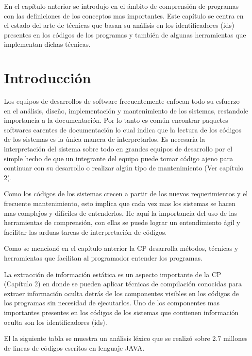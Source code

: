 \documentclass[12pt]{report}
\begin{document}

En el capítulo anterior se introdujo en el ámbito de comprensión de programas con las definiciones de los conceptos mas importantes. Este capítulo se centra en el estado del arte de técnicas que basan su análisis en los identificadores (ids) presentes en los códigos de los programas y también de algunas herramientas que implementan dichas técnicas.

\section{Introducción}

Los equipos de desarrollos de software frecuentemente enfocan todo su esfuerzo en el análisis, diseño, implementación y mantenimiento de los sistemas, restandole importancia a la documentación. Por lo tanto es común encontrar paquetes softwares carentes de documentación lo cual indica que la lectura de los códigos de los sistemas es la única manera de interpretarlos. Es necesaria la interpretación del sistema sobre todo en grandes equipos de desarrollo por el simple hecho de que un integrante del equipo puede tomar código ajeno para continuar con su desarrollo o realizar algún tipo de mantenimiento (Ver capítulo 2).

Como los códigos de los sistemas crecen a partir de los nuevos requerimientos y el frecuente mantenimiento, esto implica que cada vez mas los sistemas se hacen mas complejos y difíciles de entenderlos. He aquí la importancia del uso de las herramientas de comprensión, con ellas se puede lograr un entendimiento ágil y facilitar las arduas tareas de interpretación de códigos.

Como se mencionó en el capítulo anterior la CP desarrolla métodos, técnicas y herramientas que facilitan al programador entender los programas.

La extracción de información estática es un aspecto importante de la CP (Capítulo 2) en donde se pueden aplicar técnicas de compilación conocidas para extraer información oculta detrás de los componentes visibles en los códigos de los programas sin necesidad de ejecutarlos. Uno de los componentes mas importantes presentes en los códigos de los sistemas que contienen información oculta son los identificadores (ids).

El la siguiente tabla se muestra un análisis léxico que se realizó sobre 2.7 millones de lineas de códigos escritos en lenguaje JAVA.\\
\end{document}
